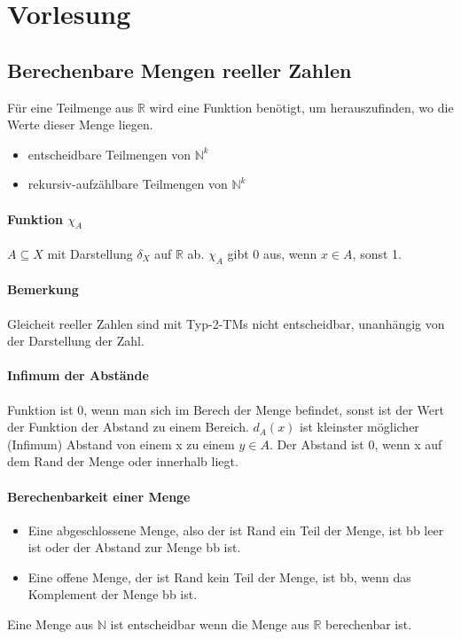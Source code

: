 \documentclass[ngerman]{scrartcl}
\begin{document}
\section{Vorlesung}
\subsection{Berechenbare Mengen reeller Zahlen}
Für eine Teilmenge aus $ \mathbb{R} $ wird eine Funktion benötigt, um herauszufinden, wo die Werte dieser Menge liegen.
\begin{itemize}
  \item entscheidbare Teilmengen von $ \mathbb{N}^k $
  \item rekursiv-aufzählbare Teilmengen von $ \mathbb{N}^k $
\end{itemize}
\paragraph{Funktion $ \chi_A $}  $ A \subseteq X $ mit Darstellung $ \delta_X $ auf $ \mathbb{R} $ ab. $ \chi_A $ gibt 0 aus, wenn $ x \in A $, sonst 1.

\paragraph{Bemerkung} Gleicheit reeller Zahlen sind mit Typ-2-TMs nicht entscheidbar, unanhängig von der Darstellung der Zahl.

\paragraph{Infimum der Abstände} Funktion ist 0, wenn man sich im Berech der Menge befindet, sonst ist der Wert der Funktion der Abstand zu einem Bereich. $ d_A(x) $ ist kleinster möglicher (Infimum) Abstand von einem x zu einem $ y \in A $. Der Abstand ist 0, wenn x auf dem Rand der Menge oder innerhalb liegt.

\paragraph{Berechenbarkeit einer Menge}
 \begin{itemize}
   \item Eine abgeschlossene Menge, also der ist Rand ein Teil der Menge, ist bb leer ist oder der Abstand zur Menge bb ist.
   \item Eine offene Menge, der ist Rand kein Teil der Menge, ist bb, wenn das Komplement der Menge bb ist.
 \end{itemize}
Eine Menge aus $\mathbb{N}$ ist entscheidbar wenn die Menge aus $\mathbb{R}$ berechenbar ist.
\end{document}
